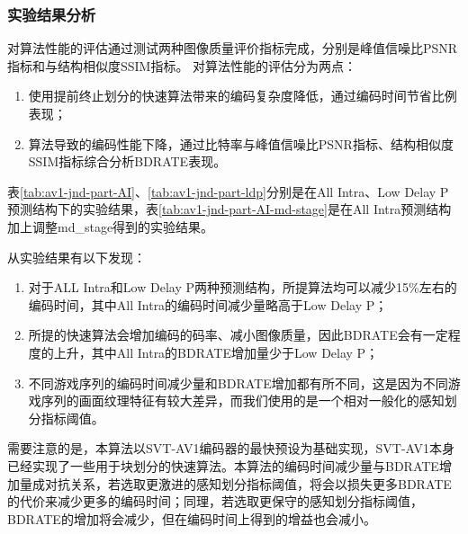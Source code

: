   \subsubsection{实验结果分析}

  对算法性能的评估通过测试两种图像质量评价指标完成，分别是峰值信噪比PSNR指标和与结构相似度SSIM指标。
  对算法性能的评估分为两点：

  \begin{enumerate}[label=\arabic*)]
    \item 使用提前终止划分的快速算法带来的编码复杂度降低，通过编码时间节省比例表现；
    \item 算法导致的编码性能下降，通过比特率与峰值信噪比PSNR指标、结构相似度SSIM指标综合分析BDRATE表现。
  \end{enumerate}

  表\ref{tab:av1-jnd-part-AI}、\ref{tab:av1-jnd-part-ldp}分别是在All Intra、Low Delay P预测结构下的实验结果，表\ref{tab:av1-jnd-part-AI-md-stage}是在All Intra预测结构加上调整md\_stage得到的实验结果。

  从实验结果有以下发现：

  \begin{enumerate}[label=\arabic*)]
    \item 对于ALL Intra和Low Delay P两种预测结构，所提算法均可以减少15\%左右的编码时间，其中All Intra的编码时间减少量略高于Low Delay P；
    \item 所提的快速算法会增加编码的码率、减小图像质量，因此BDRATE会有一定程度的上升，其中All Intra的BDRATE增加量少于Low Delay P；
    \item 不同游戏序列的编码时间减少量和BDRATE增加都有所不同，这是因为不同游戏序列的画面纹理特征有较大差异，而我们使用的是一个相对一般化的感知划分指标阈值。
  \end{enumerate}

  需要注意的是，本算法以SVT-AV1编码器的最快预设为基础实现，SVT-AV1本身已经实现了一些用于块划分的快速算法。本算法的编码时间减少量与BDRATE增加量成对抗关系，若选取更激进的感知划分指标阈值，将会以损失更多BDRATE的代价来减少更多的编码时间；同理，若选取更保守的感知划分指标阈值，BDRATE的增加将会减少，但在编码时间上得到的增益也会减小。


